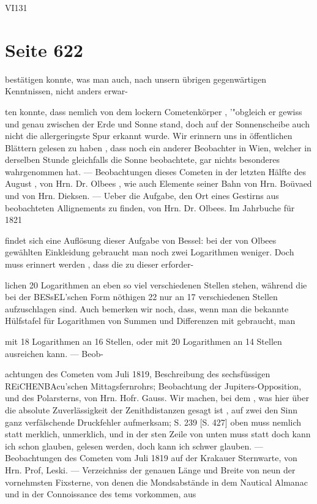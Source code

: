 \documentclass[10pt,a4paper]{article}
\begin{document}
VI131


\newpage
\section*{Seite 622}
bestätigen konnte, was man auch, nach unsern übrigen gegenwärtigen Kenntnissen, nicht anders erwar-

ten konnte, dass nemlich von dem lockern Cometenkörper , '"obgleich er gewiss und genau zwischen der Erde und Sonne stand, doch auf der Sonnenscheibe auch nicht die allergeringste Spur erkannt wurde. Wir erinnern uns in öffentlichen Blättern gelesen zu haben , dass noch ein anderer Beobachter in Wien, welcher in derselben Stunde gleichfalls die Sonne beobachtete, gar nichts besonderes wahrgenommen hat. — Beobachtungen dieses Cometen in der letzten Hälfte des August , von Hrn. Dr. Olbees , wie auch Elemente seiner Bahn von Hrn. Boüvaed und von Hrn. Dieksen. — Ueber die Aufgabe, den Ort eines Gestirns aus beobachteten Allignements zu finden, von Hrn. Dr. Olbees. Im Jahrbuche für 1821

findet sich eine Auflösung dieser Aufgabe von Bessel: bei der von Olbees gewählten Einkleidung gebraucht man noch zwei Logarithmen weniger. Doch muss erinnert werden , dass die zu dieser erforder-

lichen 20 Logarithmen an eben so viel verschiedenen Stellen stehen, während die bei der BESsEL'schen Form nöthigen 22 nur an 17 verschiedenen Stellen aufzuschlagen sind. Auch bemerken wir noch, dass, wenn man die bekannte Hülfstafel für Logarithmen von Summen und Differenzen mit gebraucht, man

mit 18 Logarithmen an 16 Stellen, oder mit 20 Logarithmen an 14 Stellen ausreichen kann. — Beob-

achtungen des Cometen vom Juli 1819, Beschreibung des sechsfüssigen REiCHENBAcu'schen Mittagsfernrohrs; Beobachtung der Jupiters-Opposition, und des Polarsterns, von Hrn. Hofr. Gauss. Wir machen, bei dem , was hier über die absolute Zuverlässigkeit der Zenithdistanzen gesagt ist , auf zwei den Sinn ganz verfälschende Druckfehler aufmerksam; S. 239 [S. 427] oben muss nemlich statt merklich, unmerklich, und in der sten Zeile von unten muss statt doch kann ich schon glauben, gelesen werden, doch kann ich schwer glauben. — Beobachtungen des Cometen vom Juli 1819 auf der Krakauer Sternwarte, von Hrn. Prof, Leski. — Verzeichniss der genauen Länge und Breite von neun der vornehmsten Fixsterne, von denen die Mondsabstände in dem Nautical Almanac und in der Connoissance des tems vorkommen, aus
\end{document}

